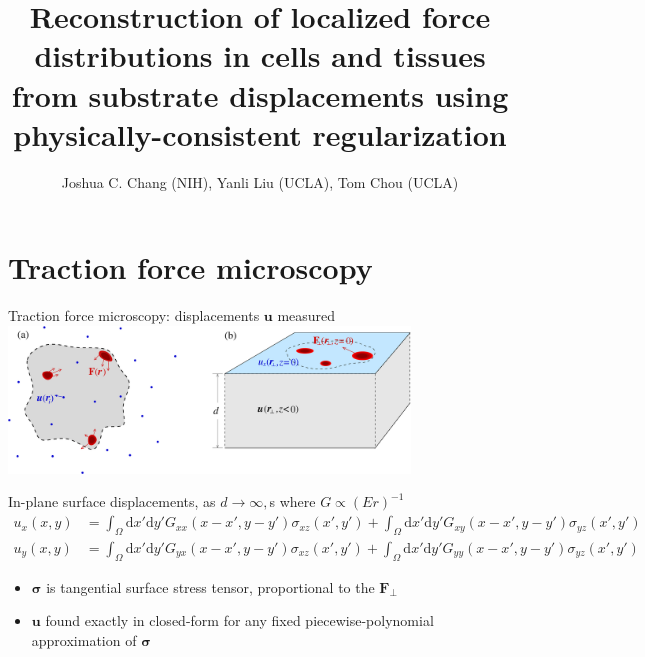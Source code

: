 \documentclass[presentation]{beamer}
\title[APS TFM talk] %
{Reconstruction of localized force distributions in cells and tissues from substrate displacements using physically-consistent regularization}
\author[Joshua C. Chang] {Joshua C. Chang (NIH), Yanli Liu (UCLA), Tom Chou (UCLA)}
\institute[NIH] %
{
National Institutes of Health
}
\date[March 16, 2017] %
{
APS March Meeting 2017 \\
Session S5: Machine Learning for Modeling and Control of Biological Systems I

}
\newcommand{\dd}{\mathrm{d}}
\newcommand{\bsigma}{\boldsymbol\sigma}
\begin{document}
\section{Traction force microscopy}

\begin{frame}
  \titlepage
\end{frame}


\begin{frame}{Traction force microscopy: displacements $\mathbf{u}$ measured}
\centering
\includegraphics[width=0.8\textwidth]{figures/Fig1}
\scriptsize
\begin{block}{In-plane surface displacements, as $d\to\infty,$s where $G \propto (Er)^{-1}$}
\vspace{-10pt}
\begin{align*}
u_{x}(x,y) &= \int_\Omega \dd x'\dd y'G_{xx}( x-x',y-y')\sigma_{xz}(x',y') 
 +  \int_\Omega \dd x'\dd y'G_{xy}( x-x',y-y')\sigma_{yz}(x',y')  \\
u_y(x,y) &= \int_\Omega \dd x'\dd y'G_{yx}( x-x',y-y')\sigma_{xz}(x',y') +  \int_\Omega \dd x'\dd y'G_{yy}( x-x',y-y')\sigma_{yz}(x',y') 
\end{align*}
\end{block}
\begin{itemize}
\item $\bsigma$ is tangential surface stress tensor, proportional to the $\mathbf{F}_\perp$
\item $\mathbf{u}$ found exactly in closed-form for any fixed piecewise-polynomial approximation of $\bsigma$
\end{itemize}
\end{frame}
\end{document}
